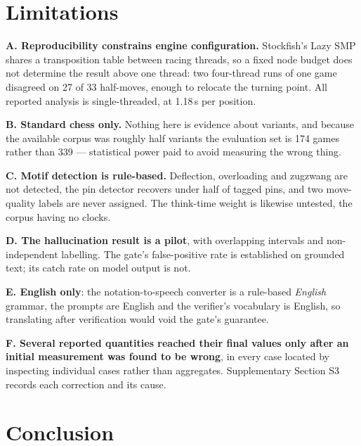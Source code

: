 \documentclass[conference]{IEEEtran}
\begin{document}
\section{Limitations}
\label{sec:limitations}

\textbf{A. Reproducibility constrains engine configuration.} Stockfish's
Lazy SMP shares a transposition table between racing threads, so a fixed
node budget does not determine the result above one thread: two four-thread
runs of one game disagreed on 27 of 33 half-moves, enough to relocate the
turning point. All reported analysis is single-threaded, at 1.18\,s per
position.

\textbf{B. Standard chess only.} Nothing here is evidence about variants,
and because the available corpus was roughly half variants the evaluation
set is 174 games rather than 339 --- statistical power paid to avoid
measuring the wrong thing.

\textbf{C. Motif detection is rule-based.} Deflection, overloading and
zugzwang are not detected, the pin detector recovers under half of tagged
pins, and two move-quality labels are never assigned. The think-time weight
is likewise untested, the corpus having no clocks.

\textbf{D. The hallucination result is a pilot}, with overlapping intervals
and non-independent labelling. The gate's false-positive rate is established
on grounded text; its catch rate on model output is not.

\textbf{E. English only}: the notation-to-speech converter is a rule-based
\emph{English} grammar, the prompts are English and the verifier's
vocabulary is English, so translating after verification would void the
gate's guarantee.

\textbf{F. Several reported quantities reached their final values only after
an initial measurement was found to be wrong}, in every case located by
inspecting individual cases rather than aggregates. Supplementary Section S3
records each correction and its cause.

\section{Conclusion}
\end{document}
